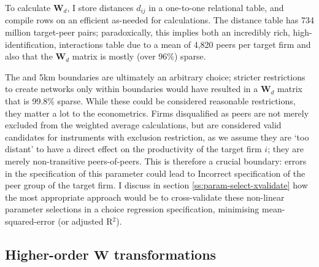 To calculate $\mathbf W_d$, I store distances $d_{ij}$ in a one-to-one relational table,
and compile rows on an efficient as-needed for calculations.
The distance table has 734 million target-peer pairs;
paradoxically, this implies both an incredibly
rich, high-identification, interactions table due to a mean of 4,820 peers per target firm
and also that the $\mathbf W_d$ matrix is mostly (over 96\%) sparse.
\par
The  and 5km boundaries are ultimately an arbitrary choice;
stricter restrictions to create networks only within  boundaries
would have resulted in a $\mathbf W_d$ matrix that is 99.8\% sparse.
While these could be considered reasonable restrictions,
they matter a lot to the econometrics.
Firms disqualified as peers are not merely
excluded from the weighted average calculations,
but are considered valid candidates for instruments with exclusion restriction,
as we assume they are `too distant' to have a direct effect
on the productivity of the target firm $i$;
they are merely non-transitive peers-of-peers.
This is therefore a crucial boundary:
errors in the specification of this parameter could lead to Incorrect
specification of the peer group of the target firm.
I discuss in section \ref{ss:param-select-xvalidate} how the most appropriate approach
would be to cross-validate these non-linear parameter selections
in a choice regression specification, minimising mean-squared-error (or adjusted R$^2$).

\subsection{Higher-order $\mathbf W$ transformations}
\label{ss:data-matrix-weights}


